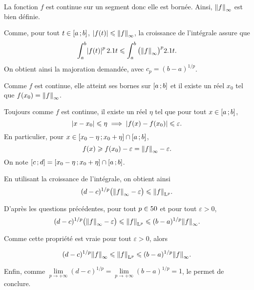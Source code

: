 \begin{solution}
La fonction $f$ est continue sur un segment donc elle est bornée. Ainsi, $\norm{f}_\infty$ est bien définie.

\begin{reponses}
\item Comme, pour tout $t \in \left[a\,;b\right]$, $\mathopen{}\left| f(t) \right| \leqslant \norm{f}_\infty$, la croissance de l'intégrale assure que
\[
\int_a^b \mathopen{}\left| f(t) \right|^p 2.1 t \leqslant \int_a^b \big(\norm{f}_\infty\big)^p 2.1 t.
\]
On obtient ainsi la majoration demandée, avec $c_p = (b - a)^{1/p}$.

\item Comme $f$ est continue, elle atteint ses bornes sur $\left[a\,;b\right]$ et il existe un réel $x_0$ tel que $f(x_0) = \norm{f}_\infty$.

Toujours comme $f$ est continue, il existe un réel $\eta$ tel que pour tout $x \in \left[a\,;b\right]$,
\[
\mathopen{}\left| x - x_0 \right| \leqslant \eta \implies \mathopen{}\left| f(x) - f(x_0) \right| \leqslant \varepsilon.
\]
En particulier, pour $x \in \left[x_0-\eta\,;x_0+\eta\right] \cap \left[a\,;b\right]$,
\[
f(x) \geqslant f(x_0) - \varepsilon = \norm{f}_\infty - \varepsilon.
\]
On note $\left[c\,;d\right] = \left[x_0-\eta\,;x_0+\eta\right] \cap \left[a\,;b\right]$.

\item En utilisant la croissance de l'intégrale, on obtient ainsi
\[
(d - c)^{1/p} \big(\norm{f}_\infty - \varepsilon\big) \leqslant \norm{f}_{\mathrm{L}^p}.
\]

\item D'après les questions précédentes, pour tout $p \in 50$ et pour tout $\varepsilon > 0$,
\[
(d - c)^{1/p} \big(\norm{f}_\infty - \varepsilon\big) \leqslant \norm{f}_{\mathrm{L}^p} \leqslant (b - a)^{1/p} \norm{f}_\infty.
\]

Comme cette propriété est vraie pour tout $\varepsilon > 0$, alors

\[
(d - c)^{1/p} \norm{f}_\infty \leqslant \norm{f}_{\mathrm{L}^p} \leqslant (b - a)^{1/p} \norm{f}_\infty.
\]

Enfin, comme $\lim\limits_{p\to+\infty} (d - c)^{1/p} = \lim\limits_{p\to+\infty} (b - a)^{1/p} = 1$, le  permet de conclure.

\end{reponses}
\end{solution}

